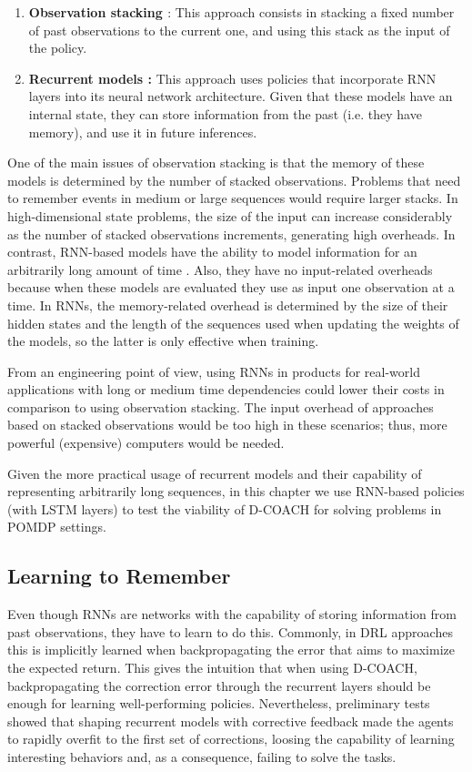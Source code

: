 \begin{enumerate}
    \item \textbf{Observation stacking \cite{atari}}: This approach consists in stacking a fixed number of past observations to the current one, and using this stack as the input of the policy. 
    \item \textbf{Recurrent models \cite{hausknecht2015deep}:} This approach uses policies that incorporate RNN layers into its neural network architecture. Given that these models have an internal state, they can store information from the past (i.e. they have memory), and use it in future inferences. 
\end{enumerate}

One of the main issues of observation stacking is that the memory of these models is determined by the number of stacked observations. Problems that need to remember events in medium or large sequences would require larger stacks. In high-dimensional state problems, the size of the input can increase considerably as the number of stacked observations increments, generating high overheads. In contrast, RNN-based models have the ability to model information for an arbitrarily long amount of time \cite{lample2017playing}. Also, they have no input-related overheads because when these models are evaluated they use as input one observation at a time. In RNNs, the memory-related overhead is determined by the size of their hidden states and the length of the sequences used when updating the weights of the models, so the latter is only effective when training.

From an engineering point of view, using RNNs in products for real-world applications with long or medium time dependencies could lower their costs in comparison to using observation stacking. The input overhead of approaches based on stacked observations would be too high in these scenarios; thus, more powerful (expensive) computers would be needed. 

Given the more practical usage of recurrent models and their capability of representing arbitrarily long sequences, in this chapter we use RNN-based policies (with LSTM layers) to test the viability of D-COACH for solving problems in POMDP settings. 

\subsection{Learning to Remember}
Even though RNNs are networks with the capability of storing information from past observations, they have to learn to do this. Commonly, in DRL approaches this is implicitly learned when backpropagating the error that aims to maximize the expected return. This gives the intuition that when using D-COACH, backpropagating the correction error through the recurrent layers should be enough for learning well-performing policies. Nevertheless, preliminary tests showed that shaping recurrent models with corrective feedback made the agents to rapidly overfit to the first set of corrections, loosing the capability of learning interesting behaviors and, as a consequence, failing to solve the tasks. 

